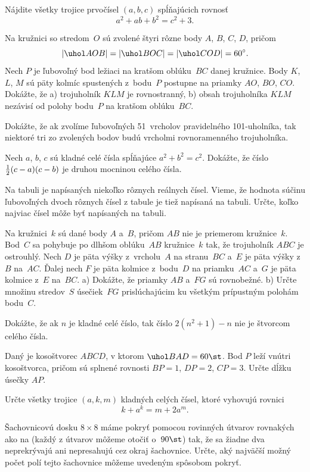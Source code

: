 {%
Nájdite všetky trojice prvočísel $(a,b,c)$ spĺňajúcich
rovnosť
$$
a^2+ab+b^2=c^2+3.
$$}

{%
Na kružnici so stredom~$O$ sú zvolené štyri rôzne body $A$, $B$, $C$, $D$, pričom
$$
|\uhol AOB|=|\uhol BOC|=|\uhol COD|=60^\circ.
$$
Nech $P$ je ľubovoľný bod ležiaci na kratšom oblúku~$BC$ danej kružnice.
Body $K$, $L$, $M$ sú päty kolmíc spustených z~bodu~$P$ postupne
na priamky $AO$, $BO$, $CO$. Dokážte, že
\ite a) trojuholník $KLM$ je rovnostranný,
\ite b) obsah trojuholníka $KLM$ nezávisí od polohy bodu~$P$ na kratšom oblúku~$BC$.\endgraf}

{%
Dokážte, že ak zvolíme ľubovoľných 51~vrcholov pravidelného 101-uholníka, tak niektoré tri
zo zvolených bodov budú vrcholmi rovnoramenného trojuholníka.}

{%
Nech $a$, $b$, $c$ sú kladné celé čísla spĺňajúce $a^2+b^2=c^2$. Dokážte, že
číslo ${1\over2}(c-a)(c-b)$ je druhou mocninou celého čísla.}

{%
Na tabuli je napísaných niekoľko rôznych reálnych čísel.
Vieme, že hodnota súčinu ľubovoľných dvoch rôznych čísel z tabule je
tiež napísaná na tabuli.
Určte, koľko najviac čísel môže byť napísaných na tabuli.}

{%
Na kružnici~$k$ sú dané body $A$ a~$B$, pričom $AB$ nie je priemerom
kružnice~$k$.
Bod~$C$ sa pohybuje po dlhšom oblúku~$AB$ kružnice~$k$ tak, že trojuholník $ABC$ je ostrouhlý.
Nech $D$ je päta výšky z~vrcholu~$A$ na stranu~$BC$ a~$E$ je päta výšky z~$B$ na~$AC$.
Ďalej nech $F$ je päta kolmice z~bodu~$D$ na priamku~$AC$ a~$G$ je päta kolmice z~$E$ na~$BC$.
\ite a) Dokážte, že priamky $AB$ a~$FG$ sú rovnobežné.
\ite b) Určte množinu stredov~$S$ úsečiek~$FG$ prislúchajúcim ku všetkým prípustným polohám bodu~$C$.\endgraf}

{%
Dokážte, že ak $n$ je kladné celé číslo, tak číslo $2(n^2 + 1) - n$ nie je
štvorcom celého čísla.}

{%
Daný je kosoštvorec $ABCD$, v ktorom $\uhol BAD = 60\st$. Bod $P$ leží vnútri kosoštvorca, pričom
sú splnené rovnosti $BP = 1$, $DP = 2$, $CP = 3$. Určte dĺžku úsečky $AP$.}

{%
Určte všetky trojice $(a,k,m)$ kladných celých čísel, ktoré vyhovujú rovnici
$$k+a^k=m+2a^m.$$
}

{%
Šachovnicovú dosku $8\times8$ máme pokryť pomocou rovinných útvarov rovnakých
ako na \obr{} (každý z útvarov môžeme otočiť o~$90\st$) tak, že sa žiadne
dva neprekrývajú ani nepresahujú cez okraj šachovnice. Určte, aký najväčší
možný počet polí tejto šachovnice môžeme uvedeným spôsobom pokryť.
%
}
